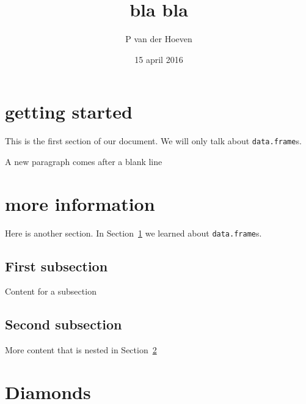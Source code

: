 \documentclass{article}\usepackage[]{graphicx}\usepackage[]{color}
\author{P van der Hoeven}
\title{bla bla}
\date{15 april 2016}
\newcommand{\dataframe}{\texttt{data.frame}}
\begin{document}
\maketitle
\tableofcontents
\section{getting started}
\label{sec:GettingStarted}
This is the  first section of our document. We will only talk about \dataframe{}s.

A new paragraph comes after a blank line

\section{more information}
\label{sec:MoreInfo}
Here is another section. In Section~\ref{sec:GettingStarted} we learned about \dataframe{}s.

\subsection{First subsection}
\label{FirstSub}
Content for a subsection

\subsection{Second subsection}
\label{SecondSub}
More content that is nested in Section~\ref{sec:MoreInfo}

\section{Diamonds}
\label{sec:Diamonds}
\end{document}
